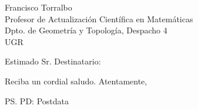 \documentclass{scrlttr2}
\begin{document}
    \begin{letter}{Francisco Torralbo\\ Profesor de Actualización Científica en Matemáticas \\  Dpto. de Geometría y Topología, Despacho 4 \\ UGR}
    
    \opening{Estimado Sr. Destinatario:}
    
    \lipsum[1]
    
    \closing{Reciba un cordial saludo. Atentamente,}
    
    \ps PD: Postdata
    \end{letter}
\end{document}
